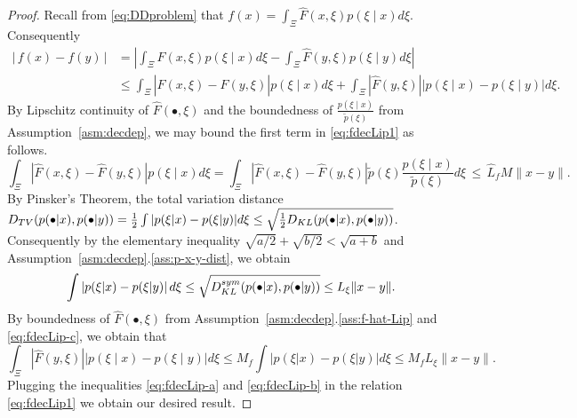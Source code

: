 \documentclass[10pt,a4paper]{amsart}
\newcommand{\beq}{\begin{equation}}
\newcommand{\eeq}{\end{equation}}
\newcommand{\lln}{\left|}
\newcommand{\mr}[1]{{\color{blue}#1}}
\newcommand{\pc}[1]{{\color{cyan}#1}}
\newcommand{\rrn}{\right|}
\newcommand{\us}[1]{\textcolor{red}{#1}}
\begin{document}
						\begin{proof}
						Recall from \eqref{eq:DDproblem} that $f(x)=\int_{\Xi} \hat{F}(x, \xi)p(\xi \mid  x) d\xi$. Consequently
						\begin{align}\label{eq:fdecLip1}
							|\, f(x)-f(y)\, |&=\left|\int_{\Xi} \hat{F}(x, \xi)p(\xi \mid  x) d\xi-\int_{\Xi} \hat{F}(y, \xi)p(\xi \mid  y) d\xi\right|\nonumber\\
							& \leq \int_\Xi\left|\hat{F}(x,\xi)-\hat{F}(y,\xi)\right| p(\xi\mid x) d\xi+\int_\Xi\left|\hat{F}(y,\xi)\right|\left|p(\xi \mid x)-p(\xi \mid y)\right|d\xi.
						\end{align}
						By Lipschitz continuity of $\hat{F}(\bullet,\xi)$ and the boundedness of $\frac{p(\xi\mid x)}{\tilde{p}(\xi)}$ from Assumption~\ref{asm:decdep}, we may bound the first term in \eqref{eq:fdecLip1} as follows.
						\beq\label{eq:fdecLip-a}
						\int_\Xi\left|\hat{F}(x,\xi)-\hat{F}(y,\xi)\right| p(\xi\mid x) d\xi=\int_\Xi\left|\hat{F}(x,\xi)-\hat{F}(y,\xi)\right|\tilde{p}(\xi) \frac{p(\xi\mid x)}{\tilde{p}(\xi)} d\xi \, \leq \,  \hat{L}_f M  {\|x-y\|}.
						\eeq
						By Pinsker's Theorem, the total variation distance $D_{\textnormal{TV}}(p(\bullet|x), p(\bullet|y)) =\frac{1}{2} \int |p(\xi|x) - p(\xi|y)| d\xi \leq \sqrt{\frac{1}{2} D_{\textnormal{KL}}(p(\bullet|x), p(\bullet|y))}$. Consequently by the elementary inequality $\sqrt{a/2}+\sqrt{b/2}<\sqrt{a+b}$ and Assumption~\ref{asm:decdep}.\ref{ass:p-x-y-dist}, we obtain
						\beq\label{eq:fdecLip-c}
						\int \lln p(\xi | x) - p(\xi|y) \rrn d\xi \leq \sqrt{D_{{\textnormal{KL}}}^{{\rm sym}}(p(\bullet |x), p(\bullet | y))} \leq L_\xi \|x-y\|. 
						\eeq
						By boundedness of $\hat{F}{(\bullet,\xi)}$ from Assumption~\ref{asm:decdep}.\ref{ass:f-hat-Lip} and \eqref{eq:fdecLip-c}, we obtain that
						\beq\label{eq:fdecLip-b}
						\int_\Xi\left|\hat{F}(y,\xi)\right|\left|p(\xi \mid x)-p(\xi \mid y)\right|d\xi \leq M_f \int \lln p(\xi | x) - p(\xi|y) \rrn d\xi \leq M_f L_\xi {\|x-y\|}.
						\eeq
						Plugging the inequalities \eqref{eq:fdecLip-a} and \eqref{eq:fdecLip-b} in the relation \eqref{eq:fdecLip1} we obtain our desired result.

\end{proof}
\end{document}
